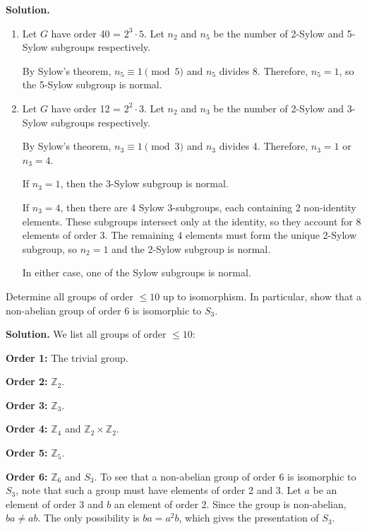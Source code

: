 \noindent\textbf{Solution.}
\begin{enumerate}[label=(\alph*)]
\item Let $G$ have order 40 = $2^3 \cdot 5$. Let $n_2$ and $n_5$ be the number of 2-Sylow and 5-Sylow subgroups respectively.

By Sylow's theorem, $n_5 \equiv 1 \pmod{5}$ and $n_5$ divides 8. Therefore, $n_5 = 1$, so the 5-Sylow subgroup is normal.

\item Let $G$ have order 12 = $2^2 \cdot 3$. Let $n_2$ and $n_3$ be the number of 2-Sylow and 3-Sylow subgroups respectively.

By Sylow's theorem, $n_3 \equiv 1 \pmod{3}$ and $n_3$ divides 4. Therefore, $n_3 = 1$ or $n_3 = 4$.

If $n_3 = 1$, then the 3-Sylow subgroup is normal.

If $n_3 = 4$, then there are 4 Sylow 3-subgroups, each containing 2 non-identity elements. These subgroups intersect only at the identity, so they account for 8 elements of order 3. The remaining 4 elements must form the unique 2-Sylow subgroup, so $n_2 = 1$ and the 2-Sylow subgroup is normal.

In either case, one of the Sylow subgroups is normal.
\end{enumerate}

\begin{problembox}
Determine all groups of order $\leq 10$ up to isomorphism. In particular, show that a non-abelian group of order 6 is isomorphic to $S_3$.
\end{problembox}

\noindent\textbf{Solution.} We list all groups of order $\leq 10$:

\textbf{Order 1:} The trivial group.

\textbf{Order 2:} $\mathbb{Z}_2$.

\textbf{Order 3:} $\mathbb{Z}_3$.

\textbf{Order 4:} $\mathbb{Z}_4$ and $\mathbb{Z}_2 \times \mathbb{Z}_2$.

\textbf{Order 5:} $\mathbb{Z}_5$.

\textbf{Order 6:} $\mathbb{Z}_6$ and $S_3$. To see that a non-abelian group of order 6 is isomorphic to $S_3$, note that such a group must have elements of order 2 and 3. Let $a$ be an element of order 3 and $b$ an element of order 2. Since the group is non-abelian, $ba \neq ab$. The only possibility is $ba = a^2b$, which gives the presentation of $S_3$.

